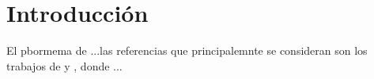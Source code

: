 
\chapter{Introducción} 
\label{chap:intro}



El pbormema de ...las referencias que principalemnte se consideran son los trabajos de  \citet{Liu2008,Casella2002} y  \citep[como por ejemplo][entre otros]{Kotecha1999, Horrace2005}, donde  ... 

\lipsum[17]

\lipsum[2-4]

\lipsum[17]